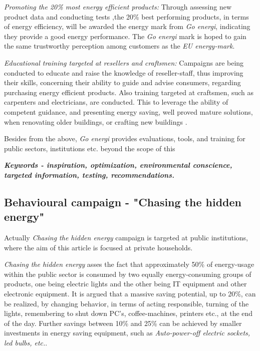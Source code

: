 \documentclass[journal]{IEEEtran}
\begin{document}
\textit{Promoting the 20\% most energy efficient products:} Through assessing new product data and conducting tests ,the 20\% best performing products, in terms of energy efficiency, will be awarded the energy mark from \textit{Go energi}, indicating they provide a good energy performance. The \textit{Go energi} mark is hoped to gain the same trustworthy perception among customers as the \textit{EU energy-mark}. 

\textit{Educational training targeted at resellers and craftsmen:} Campaigns are being conducted to educate and raise the knowledge of reseller-staff, thus 
improving their skills, concerning their ability to guide and advise consumers, regarding purchasing energy efficient products.
Also training targeted at craftsmen, such as carpenters and electricians, are conducted. This to leverage the ability of competent guidance, and presenting energy saving, well proved mature solutions, when renovating older buildings, or crafting new buildings \cite{annual_ens_11}.  

Besides from the above, \textit{Go energi} provides evaluations, tools, and training for  public sectors, institutions etc. beyond the scope of this \newline

\textbf{\textit{Keywords - inspiration, optimization, environmental conscience, targeted information, testing, recommendations.}}

\subsection{Behavioural campaign - "Chasing the hidden energy"}
Actually \textit{Chasing the hidden energy} campaign is targeted at public institutions, where the aim of this article is focused at private households. 

\textit{Chasing the hidden energy} asses the fact that approximately 50\% of energy-usage within the public sector is consumed by two equally energy-consuming groups of products, one being electric lights and the other being IT equipment and other electronic equipment\cite{bk_2004}.
It is argued that a massive saving potential, up to 20\%, can be realized, by changing behavior, in terms of acting responsible, turning of the lights, remembering to shut down PC's, coffee-machines, printers etc., at the end of the day. 
Further savings between 10\% and 25\% can be achieved by smaller investments in energy saving equipment, such as \textit{Auto-power-off electric sockets, led bulbs, etc.}\cite{hidden_e}. 
\end{document}
